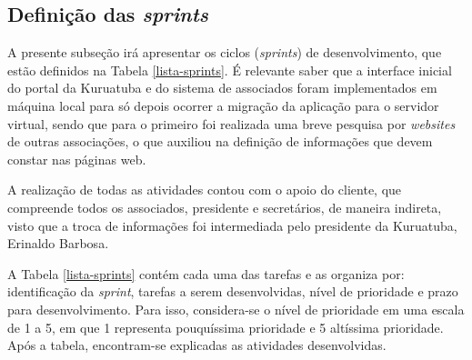 \hspace{2.5cm}
\subsection{Definição das \textit{sprints}}
\label{subsec:sprints}
\hspace{2.5cm}

A presente subseção irá apresentar os ciclos (\textit{sprints}) de desenvolvimento, que estão definidos na Tabela \ref{lista-sprints}. É relevante saber que a interface inicial do portal da Kuruatuba e do sistema de associados foram implementados em máquina local para só depois ocorrer a migração da aplicação para o servidor virtual, sendo que para o primeiro foi realizada uma breve pesquisa por \textit{websites} de outras associações, o que auxiliou na definição de informações que devem constar nas páginas web. 

A realização de todas as atividades contou com o apoio do cliente, que compreende todos os associados, presidente e secretários, de maneira indireta, visto que a troca de informações foi intermediada pelo presidente da Kuruatuba, Erinaldo Barbosa.

A Tabela \ref{lista-sprints} contém cada uma das tarefas e as organiza por: identificação da \textit{sprint}, tarefas a serem desenvolvidas, nível de prioridade e prazo para desenvolvimento. Para isso, considera-se o nível de prioridade em uma escala de 1 a 5, em que 1 representa pouquíssima prioridade e 5 altíssima prioridade. Após a tabela, encontram-se explicadas as atividades desenvolvidas.

